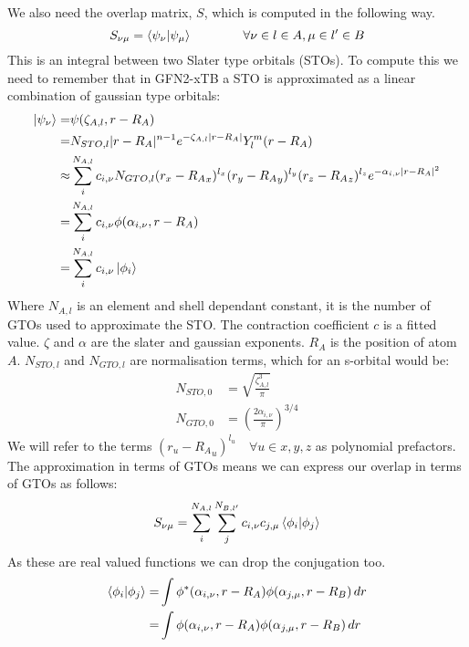 We also need the overlap matrix, $S$, which is computed in the following way.
\begin{equation}
S_{\nu\mu} = \braket{\psi_\nu|\psi_\mu}\quad\quad\quad\quad\forall \nu \in l \in A,\mu \in l' \in B
\end{equation}
This is an integral between two Slater type orbitals (STOs). To compute this we need to remember that in GFN2-xTB a STO is approximated as a linear combination of gaussian type orbitals:
\begin{equation}
    \begin{split}
        \ket{\psi_\nu} =&\psi(\zeta_{A,l},r-R_A) \\
        = &N_{STO,l}|r-R_A|^{n-1}e^{-\zeta_{A,l}|r-R_A|}Y_l^m(r-R_A)\\
        \approx &\sum_i^{N_{A,l}}c_{i,\nu}N_{GTO,l}(r_x-{R_A}_x)^{l_x}(r_y-{R_A}_y)^{l_y}(r_z-{R_A}_z)^{l_z}e^{-\alpha_{i,\nu}|r-R_A|^2}\\
        =& \sum_i^{N_{A,l}}c_{i,\nu}\phi(\alpha_{i,\nu},r-R_A)\\
        =& \sum_i^{N_{A,l}}c_{i,\nu}\ket{\phi_i}
    \end{split}
\end{equation}
Where $N_{A,l}$ is an element and shell dependant constant, it is the number of GTOs used to approximate the STO. The contraction coefficient $c$ is a fitted value. $\zeta$ and $\alpha$ are the slater and gaussian exponents. $R_A$ is the position of atom $A$. $N_{STO,l}$ and $N_{GTO,l}$ are normalisation terms, which for an s-orbital would be:
\begin{align}
    N_{STO,0}&=\sqrt{\frac{\zeta_{A,l}^3}{\pi}}\\
    N_{GTO,0}&=\left(\frac{2\alpha_{i,\nu}}{\pi}\right)^{3/4}
\end{align}
We will refer to the terms $(r_u-{R_A}_u)^{l_u}\quad\forall{u\in x,y,z}$ as polynomial prefactors. 
The approximation in terms of GTOs means we can express our overlap in terms of GTOs as follows:
\begin{equation}
    S_{\nu\mu} =\sum_i^{N_{A,l}}\sum_j^{N_{B,l'}}c_{i,\nu}c_{j,\mu} \braket{\phi_i|\phi_j}
\end{equation}
As these are real valued functions we can drop the conjugation too.
\begin{equation}
    \begin{split}
        \braket{\phi_i|\phi_j} = &\int \phi^*(\alpha_{i,\nu},r-R_A)\phi(\alpha_{j,\mu},r-R_B)\,dr\\
        =&\int \phi(\alpha_{i,\nu},r-R_A)\phi(\alpha_{j,\mu},r-R_B)\,dr\\
    \end{split}
\end{equation}
